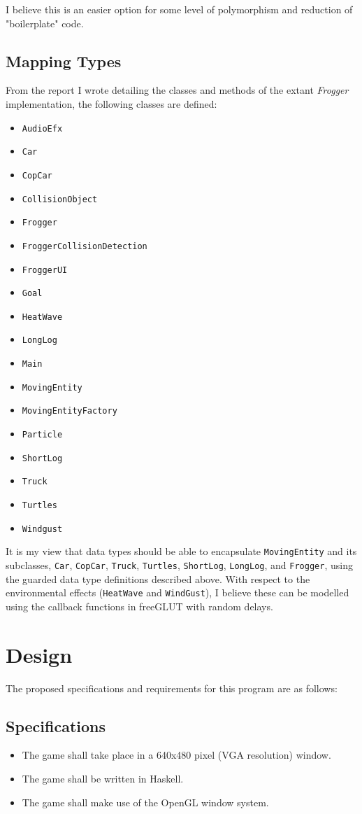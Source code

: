 \documentclass[12pt, a4paper]{report}
\begin{document}
I believe this is an easier option for some level of polymorphism and reduction of "boilerplate" code.

\subsection{Mapping Types}
From the report I wrote detailing the classes and methods of the extant \textit{Frogger} implementation, the following classes are defined:
\begin{itemize}
  \item \verb|AudioEfx|
  \item \verb|Car|
  \item \verb|CopCar|
  \item \verb|CollisionObject|
  \item \verb|Frogger|
  \item \verb|FroggerCollisionDetection|
  \item \verb|FroggerUI|
  \item \verb|Goal|
  \item \verb|HeatWave|
  \item \verb|LongLog|
  \item \verb|Main|
  \item \verb|MovingEntity|
  \item \verb|MovingEntityFactory|
  \item \verb|Particle|
  \item \verb|ShortLog|
  \item \verb|Truck|
  \item \verb|Turtles|
  \item \verb|Windgust|
\end{itemize}

It is my view that data types should be able to encapsulate \verb|MovingEntity| and its subclasses, \verb|Car|, \verb|CopCar|, \verb|Truck|, \verb|Turtles|, \verb|ShortLog|, \verb|LongLog|, and \verb|Frogger|, using the guarded data type definitions described above.
With respect to the environmental effects (\verb|HeatWave| and \verb|WindGust|), I believe these can be modelled using the callback functions in freeGLUT with random delays.

\section{Design}
The proposed specifications and requirements for this program are as follows:

\subsection{Specifications}
\begin{itemize}
  \item The game shall take place in a 640x480 pixel (VGA resolution) window.
  \item The game shall be written in Haskell.
  \item The game shall make use of the OpenGL window system.
\end{itemize}
\end{document}
